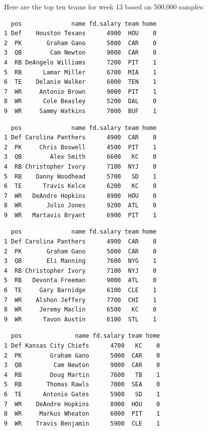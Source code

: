 \documentclass[10pt]{article}
\begin{document}
\thispagestyle{fancy}


\noindent Here are the top ten teams for week 13 based on 500,000 samples:
\begin{lstlisting}
  pos              name fd.salary team home
1 Def    Houston Texans      4900  HOU    0
2  PK       Graham Gano      5000  CAR    0
3  QB        Cam Newton      9000  CAR    0
4  RB DeAngelo Williams      7200  PIT    1
5  RB      Lamar Miller      6700  MIA    1
6  TE    Delanie Walker      6000  TEN    1
7  WR     Antonio Brown      9000  PIT    1
8  WR      Cole Beasley      5200  DAL    0
9  WR     Sammy Watkins      7000  BUF    1
\end{lstlisting}

\begin{lstlisting}
  pos              name fd.salary team home
1 Def Carolina Panthers      4900  CAR    0
2  PK     Chris Boswell      4500  PIT    1
3  QB        Alex Smith      6600   KC    0
4  RB Christopher Ivory      7100  NYJ    0
5  RB    Danny Woodhead      5700   SD    1
6  TE      Travis Kelce      6200   KC    0
7  WR   DeAndre Hopkins      8900  HOU    0
8  WR       Julio Jones      9200  ATL    0
9  WR   Martavis Bryant      6900  PIT    1
\end{lstlisting}

\begin{lstlisting}
  pos              name fd.salary team home
1 Def Carolina Panthers      4900  CAR    0
2  PK       Graham Gano      5000  CAR    0
3  QB       Eli Manning      7600  NYG    1
4  RB Christopher Ivory      7100  NYJ    0
5  RB   Devonta Freeman      9000  ATL    0
6  TE     Gary Barnidge      6100  CLE    1
7  WR    Alshon Jeffery      7700  CHI    1
8  WR     Jeremy Maclin      6500   KC    0
9  WR      Tavon Austin      6100  STL    1
\end{lstlisting}

\begin{lstlisting}
  pos               name fd.salary team home
1 Def Kansas City Chiefs      4700   KC    0
2  PK        Graham Gano      5000  CAR    0
3  QB         Cam Newton      9000  CAR    0
4  RB        Doug Martin      7600   TB    1
5  RB       Thomas Rawls      7000  SEA    0
6  TE      Antonio Gates      5900   SD    1
7  WR    DeAndre Hopkins      8900  HOU    0
8  WR     Markus Wheaton      6000  PIT    1
9  WR    Travis Benjamin      5900  CLE    1
\end{lstlisting}
\end{document}
